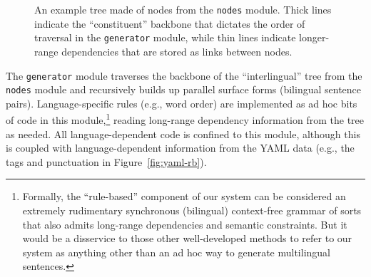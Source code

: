 {\begin{figure}[ht]
    \caption{
        An example tree made of nodes from the {\small \tt nodes} module.
        Thick lines indicate the ``constituent'' backbone that dictates the order of traversal in the {\small \tt generator} module, while thin lines indicate longer-range dependencies that are stored as links between nodes.
    }
    \label{fig:tree}

\end{figure}
    




The {\small \tt generator} module traverses the backbone of the ``interlingual'' tree from the {\small \tt nodes} module and recursively builds up parallel surface forms (bilingual sentence pairs).
Language-specific rules (e.g., word order) are implemented as ad hoc bits of code in this module,\footnote{
    Formally, the ``rule-based'' component of our system can be considered an extremely rudimentary synchronous (bilingual) context-free grammar of sorts  that also admits long-range dependencies and semantic constraints.
    But it would be a disservice to those other well-developed methods to refer to our system as anything other than an ad hoc way to generate multilingual sentences.
} reading long-range dependency information from the tree as needed.
All language-dependent code is confined to this module, although this is coupled with language-dependent information from the YAML data (e.g., the tags and punctuation in Figure~\ref{fig:yaml-rb}). 


}
